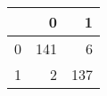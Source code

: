 \begin{tabular}{lrr}
\toprule
{} &    0 &    1 \\
\midrule
0 &  141 &    6 \\
1 &    2 &  137 \\
\bottomrule
\end{tabular}
